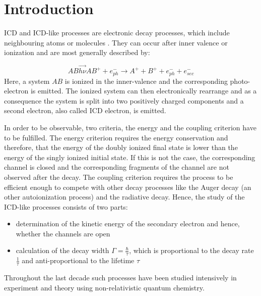\chapter{Introduction}
\ac{ICD} and \ac{ICD}-like processes are electronic decay processes,
which include neighbouring atoms or molecules \cite{Cederbaum97}.
They can occur after inner valence or ionization and
are most generally described by:

\begin{equation*}
 AB \overrightarrow{h\nu} AB^+ + e^-_{ph}
    \rightarrow A^+ + B^+ + e^-_{ph} + e^-_{sec}
\end{equation*}
Here, a system $AB$ is ionized in the inner-valence and the corresponding
photo-electron is emitted. The ionized system can then electronically
rearrange and as a consequence the system is split into two positively
charged components and a second electron, also called ICD electron, is
emitted.

In order to be observable, two criteria, the energy and the coupling criterion
have to be fulfilled. The energy criterion requires the energy conservation
and therefore, that the energy of the doubly ionized final state is lower than
the energy of the singly ionized initial state. If this is not the case, the
corresponding channel is closed and the corresponding fragments of the
channel are not observed after the decay.
The coupling criterion requires the process to be efficient enough to compete
with other decay processes like the Auger decay (an other autoionization
process) and the radiative decay.
Hence, the study of the \ac{ICD}-like processes consists of two parts:
\begin{itemize}
 \item determination of the kinetic energy of the secondary electron
       and hence, whether the channels are open
 \item calculation of the decay width $\Gamma=\frac{\hbar}{\tau}$, which
       is proportional to the decay rate $\frac{1}{\tau}$ and
       anti-proportional to the lifetime $\tau$
\end{itemize}

Throughout the last decade such processes have been studied intensively
in experiment \cite{}
and theory \cite{}
using non-relativistic quantum chemistry.
